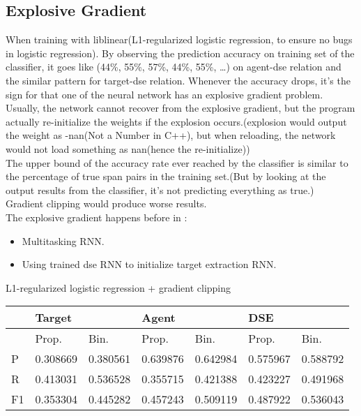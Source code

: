 \documentclass[a4paper, 12pt]{article}
\begin{document}
\subsection{Explosive Gradient}

When training with liblinear(L1-regularized logistic regression, to
ensure no  
bugs in logistic regression).
By observing the prediction accuracy on training set of the classifier, 
it goes like (44\%, 55\%, 57\%, 44\%, 55\%, \ldots) on agent-dse relation and
the similar pattern for target-dse relation. Whenever the accuracy drops, it's
the sign for that one of the neural network has an explosive gradient
problem. Usually, the network cannot recover from the explosive gradient, but
the program actually re-initialize the weights if the explosion
occurs.(explosion would output the weight as -nan(Not a Number in C++), but when
reloading, the network would not load something as nan(hence the
re-initialize))\\
The upper bound of the accuracy rate ever reached by the
classifier is similar to the percentage of true span pairs in the training
set.(But by looking at the output results from the classifier, it's not
predicting everything as true.)\\
Gradient clipping would produce worse results.\\
The explosive gradient happens before in : 
\begin{itemize} 
  \item Multitasking RNN.
  \item Using trained dse RNN to initialize target extraction RNN.
\end{itemize}

L1-regularized logistic regression + gradient clipping

\begin{table}[h!]
\centering
\begin{tabular}{l|ll|ll|ll}
\hline
   & \multicolumn{2}{l}{Target} & \multicolumn{2}{l}{Agent} & \multicolumn{2}{l}{DSE} \\ \hline
   & Prop.& Bin.& Prop.& Bin.& Prop.& Bin.\\
 \hline
P  &0.308669&0.380561 &0.639876 & 0.642984 &0.575967 & 0.588792 \\
R  &0.413031&0.536528 &0.355715 & 0.421388 &0.423227 & 0.491968 \\
F1 &0.353304&0.445282 &0.457243 & 0.509119 &0.487922 & 0.536043 \\ \hline
\end{tabular}
\end{table}
\end{document}
